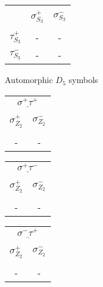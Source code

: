 \documentclass[12pt]{article}
\begin{document}
\begin{center}
\begin{tabular}{ c | c | c |}
\multicolumn{1}{c}{} & \multicolumn{1}{c}{} & \multicolumn{1}{c}{}\\
\multicolumn{1}{c}{} & \multicolumn{1}{c}{$\sigma_{S_3}^+$} & \multicolumn{1}{c}{$\sigma_{S_3}^-$} \\[-1em]
\multicolumn{1}{c}{} & \multicolumn{1}{c}{} & \multicolumn{1}{c}{} \\
\cline{2-3} $\tau_{S_3}^+$ & - & - \\
\cline{2-3} $\tau_{S_3}^-$ & - & - \\
\cline{2-3}
\end{tabular}
\vspace{.6cm}

Automorphic $D_5$ symbols

\begin{tabular}{| c | c |}
\multicolumn{2}{c}{$\underline{\sigma^+ \tau^+}$} \\[-1em]
\multicolumn{1}{c}{} & \multicolumn{1}{c}{} \\
\multicolumn{1}{c}{$\sigma_{Z_2}^+$} & \multicolumn{1}{c}{$\sigma_{Z_2}^-$} \\[-1em]
\multicolumn{1}{c}{} & \multicolumn{1}{c}{} \\
\hline
- & - \\
\hline
\end{tabular} 
\hspace{1.2cm}
\begin{tabular}{| c | c |}
\multicolumn{2}{c}{$\underline{\sigma^+ \tau^-}$} \\[-1em]
\multicolumn{1}{c}{} & \multicolumn{1}{c}{} \\
\multicolumn{1}{c}{$\sigma_{Z_2}^+$} & \multicolumn{1}{c}{$\sigma_{Z_2}^-$} \\[-1em]
\multicolumn{1}{c}{} & \multicolumn{1}{c}{} \\
\hline
- & - \\
\hline
\end{tabular} 
\hspace{1.2cm}
\begin{tabular}{| c | c |}
\multicolumn{2}{c}{$\underline{\sigma^- \tau^+}$} \\[-1em]
\multicolumn{1}{c}{} & \multicolumn{1}{c}{} \\
\multicolumn{1}{c}{$\sigma_{Z_2}^+$} & \multicolumn{1}{c}{$\sigma_{Z_2}^-$} \\[-1em]
\multicolumn{1}{c}{} & \multicolumn{1}{c}{} \\
\hline
- & - \\
\hline
\end{tabular} 

\end{center}
\end{document}

